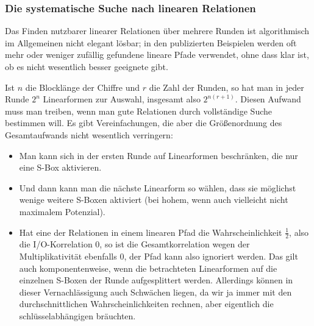 \begin{refsegment}
\subsubsection*{Die systematische Suche nach linearen Relationen}

Das Finden nutzbarer linearer
Relationen über
mehrere Runden ist
algorithmisch im Allgemeinen nicht elegant lösbar; in den publizierten
Beispielen werden oft mehr oder weniger zufällig gefundene
lineare Pfade verwendet,
ohne dass klar ist, ob es nicht wesentlich besser geeignete gibt.

Ist $n$ die Blocklänge der Chiffre und $r$ die Zahl der Runden, so
hat man in jeder Runde $2^n$ Linearformen zur Auswahl, insgesamt also
$2^{n(r+1)}$. Diesen Aufwand muss man treiben, wenn man gute
Relationen durch vollständige Suche bestimmen will. Es gibt
Vereinfachungen, die aber die Größenordnung des Gesamtaufwands
nicht wesentlich verringern:
\begin{itemize}
   \item Man kann sich in der ersten Runde auf Linearformen beschränken,
      die nur eine S-Box aktivieren.
   \item Und dann kann man die nächste Linearform so wählen, dass sie
      möglichst wenige weitere S-Boxen aktiviert
      (bei hohem, wenn auch vielleicht nicht maximalem Potenzial).
   \item Hat eine der Relationen in einem linearen Pfad die Wahrscheinlichkeit
      $\frac{1}{2}$, also die I/O-Korrelation $0$, so ist die Gesamtkorrelation
      wegen der Multiplikativität ebenfalls $0$, der Pfad kann also
      ignoriert werden. Das gilt auch komponentenweise, wenn die
      betrachteten Linearformen auf die einzelnen S-Boxen der Runde
      aufgesplittert werden. Allerdings können in dieser Vernachlässigung
      auch Schwächen liegen, da wir ja immer mit den durchschnittlichen
      Wahrscheinlichkeiten rechnen, aber eigentlich die schlüsselabhängigen
      bräuchten.
\end{itemize}


\end{refsegment}
